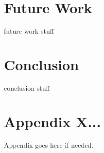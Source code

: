 \documentclass[jair,twoside,11pt,theapa]{article}
\begin{document}
\section{Future Work}
\label{future-work}

future work stuff

\section{Conclusion}
\label{conclusion}
conclusion stuff


\appendix
\section*{Appendix X...}

Appendix goes here if needed.

\vskip 0.2in


\end{document}
